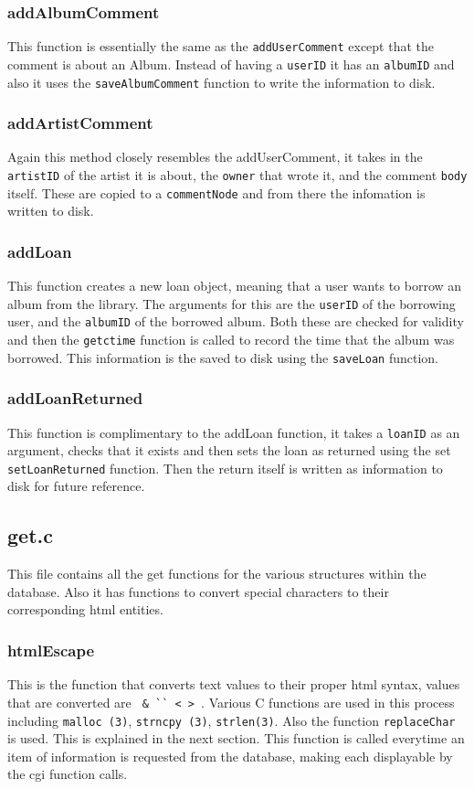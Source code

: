 \documentclass{article}
\begin{document}
\subsubsection*{addAlbumComment}
This function is essentially the same as the \verb|addUserComment| except that the comment is about an Album. Instead of having a \verb|userID| it has an \verb|albumID| and also it uses the \verb|saveAlbumComment| function to write the information to disk.

\subsubsection*{addArtistComment}
Again this method closely resembles the addUserComment, it takes in the \verb|artistID| of the artist it is about, the \verb|owner| that wrote it, and the comment \verb|body| itself. These are copied to a \verb|commentNode| and from there the infomation is written to disk.

\subsubsection*{addLoan}
This function creates a new loan object, meaning that a user wants to borrow an album from the library. The arguments for this are the \verb|userID| of the borrowing user, and the \verb|albumID| of the borrowed album. Both these are checked for validity and then the \verb|getctime| function is called to record the time that the album was borrowed. This information is the saved to disk using the \verb|saveLoan| function.

\subsubsection*{addLoanReturned}
This function is complimentary to the addLoan function, it takes a \verb|loanID| as an argument, checks that it exists and then sets the loan as returned using the set \verb|setLoanReturned| function. Then the return itself is written as information to disk for future reference.

\subsection{get.c}
This file contains all the get functions for the various structures within the database. Also it has functions to convert special characters to their corresponding html entities.

\subsubsection*{htmlEscape}
This is the function that converts text values to their proper html syntax, values that are converted are \verb| & `` < > |. Various C functions are used in this process including \verb|malloc (3)|, \verb|strncpy (3)|, \verb|strlen(3)|. Also the function \verb|replaceChar| is used. This is explained in the next section. This function is called everytime an item of information is requested from the database, making each displayable by the cgi function calls.
\end{document}
